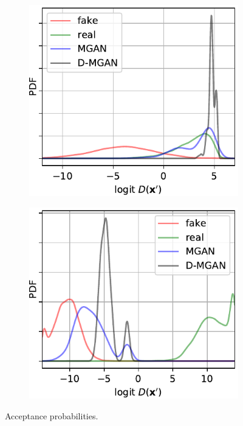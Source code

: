 \documentclass{article}
\begin{document}
\begin{figure}
    \centering
    \begin{subfigure}[b]{0.49\textwidth}
       \includegraphics[scale=0.9]{figures/score_dist_overlap.pdf}
    \end{subfigure}
    \begin{subfigure}[b]{0.49\textwidth}
       \includegraphics[scale=0.9]{figures/score_dist_no_overlap.pdf}
    \end{subfigure}
    \caption{{\small
    Acceptance probabilities.
    }}
    \label{fig:score_dist}
\end{figure}
\end{document}
